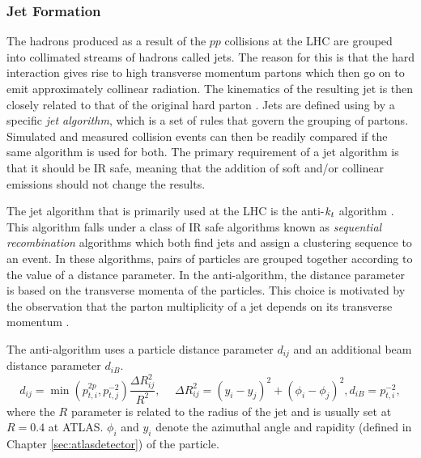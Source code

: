 \subsubsection{Jet Formation}\label{sec:theory:jet}

The hadrons produced as a result of the $pp$ collisions at the LHC are grouped into collimated streams of hadrons called jets. The reason for this is that the hard interaction gives rise to high transverse momentum partons which then go on to emit approximately collinear radiation. The kinematics of the resulting jet is then closely related to that of the original hard parton \cite{Atlas:Salam2009}. Jets are defined using by a specific \textit{jet algorithm}, which is a set of rules that govern the grouping of partons. Simulated and measured collision events can then be readily compared if the same algorithm is used for both. The primary requirement of a jet algorithm is that it should be IR safe, meaning that the addition of soft and/or collinear emissions should not change the results. 

The jet algorithm that is primarily used at the LHC is the anti-$k_{t}$ algorithm \cite{Insitu:antikt}. This algorithm falls under a class of IR safe algorithms known as \textit{sequential recombination} algorithms which both find jets and assign a clustering sequence to an event. In these algorithms, pairs of particles are grouped together according to the value of a distance parameter. In the anti-\kt algorithm, the distance parameter is based on the transverse momenta of the particles. This choice is motivated by the observation that the parton multiplicity of a jet depends on its transverse momentum \cite{Atlas:Lee,Atlas:Dokshitzer,Atlas:Catani}.

The anti-\kt algorithm uses a particle distance parameter $d_{ij}$ and an additional beam distance parameter $d_{iB}$. 
\begin{subequations}\label{eq:dijdib}
\begin{equation}\label{eq:dij}
    d_{ij}=\min(p^{2p}_{t,i},p^{-2}_{t,j})\frac{\Delta R^2_{ij}}{R^2},\hspace{15pt}\Delta R^2_{ij}=(y_i-y_j)^2+(\phi_i-\phi_j)^2,
\end{equation}
\begin{equation}\label{eq:dib}
    d_{iB}=p^{-2}_{t,i},
\end{equation}
\end{subequations}
where the $R$ parameter is related to the radius of the jet and is usually set at $R=0.4$ at ATLAS. $\phi_i$ and $y_i$ denote the azimuthal angle and rapidity (defined in Chapter \ref{sec:atlasdetector}) of the particle.


